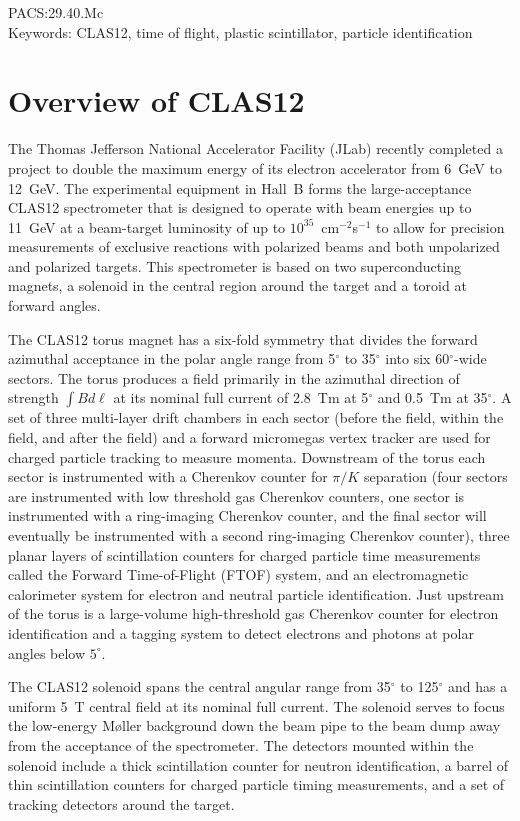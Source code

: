 \documentclass[3p,times,twocolumn]{elsarticle}
\begin{document}
PACS:29.40.Mc \\
Keywords: CLAS12, time of flight, plastic scintillator, particle identification

\section{Overview of CLAS12}

The Thomas Jefferson National Accelerator Facility (JLab) recently completed a project to double
the maximum energy of its electron accelerator from 6~GeV to 12~GeV. The experimental equipment
in Hall~B forms the large-acceptance CLAS12 spectrometer that is designed to operate with beam
energies up to 11~GeV at a beam-target luminosity of up to $10^{35}$~cm$^{-2}$s$^{-1}$ to allow for
precision measurements of exclusive reactions with polarized beams and both unpolarized and polarized
targets. This spectrometer is based on two superconducting magnets, a solenoid in the central region
around the target and a toroid at forward angles. 

The CLAS12 torus magnet has a six-fold symmetry that divides the forward azimuthal acceptance in the
polar angle range from 5$^\circ$ to 35$^\circ$ into six 60$^\circ$-wide sectors. The torus produces a field
primarily in the azimuthal direction of strength $\int \!B d\ell$ at its nominal full current of 2.8~Tm at
5$^\circ$ and 0.5~Tm at 35$^\circ$. A set of three multi-layer drift chambers in each sector (before the
field, within the field, and after the field) and a forward micromegas vertex tracker are used for charged
particle tracking to measure momenta. Downstream of the torus each sector is instrumented with a Cherenkov
counter for $\pi/K$ separation (four sectors are instrumented with low threshold gas Cherenkov counters, one
sector is instrumented with a ring-imaging Cherenkov counter, and the final sector will eventually be
instrumented with a second ring-imaging Cherenkov counter), three planar layers of scintillation counters for
charged particle time measurements called the Forward Time-of-Flight (FTOF) system, and an electromagnetic
calorimeter system for electron and neutral particle identification. Just upstream of the torus is a large-volume
high-threshold gas Cherenkov counter for electron identification and a tagging system to detect electrons and
photons at polar angles below $5^\circ$.

The CLAS12 solenoid spans the central angular range from 35$^\circ$ to 125$^\circ$ and has a uniform 5~T
central field at its nominal full current. The solenoid serves to focus the low-energy M{\o}ller background down
the beam pipe to the beam dump away from the acceptance of the spectrometer. The detectors mounted within
the solenoid include a thick scintillation counter for neutron identification, a barrel of thin scintillation counters
for charged particle timing measurements, and a set of tracking detectors around the target.
\end{document}

